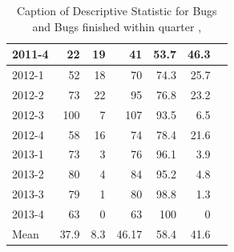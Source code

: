 \documentclass[UKenglish]{ifimaster}  %
\begin{document}
\begin{table}[!htbp]
\begin{adjustwidth}{-2.5cm}{}
{{\begin{tabular}{ | l | r | r | r | r | r | r | }
2011-4 & 22 & 19 & 41 & 53.7 & 46.3 \\ \hline
2012-1 & 52 & 18 & 70 & 74.3 & 25.7 \\ \hline
2012-2 & 73 & 22 & 95 & 76.8 & 23.2 \\ \hline
2012-3 & 100 & 7 & 107 & 93.5 & 6.5 \\ \hline
2012-4 & 58 & 16 & 74 & 78.4 & 21.6 \\ \hline
2013-1 & 73 & 3 & 76 & 96.1 & 3.9 \\ \hline
2013-2 & 80 & 4 & 84 & 95.2 & 4.8 \\ \hline
2013-3 & 79 & 1 & 80 & 98.8 & 1.3 \\ \hline
2013-4 & 63 & 0 & 63 & 100 & 0 \\ \hline
Mean & 37.9 & 8.3 & 46.17 & 58.4& 41.6 \\ \hline
\end{tabular}
}
}
\end{adjustwidth}
\caption[Optional caption for list of figures]{Caption of Descriptive Statistic for Bugs and Bugs finished within quarter  , }
\label{DS:2:5} %
\end{table}
\end{document}
